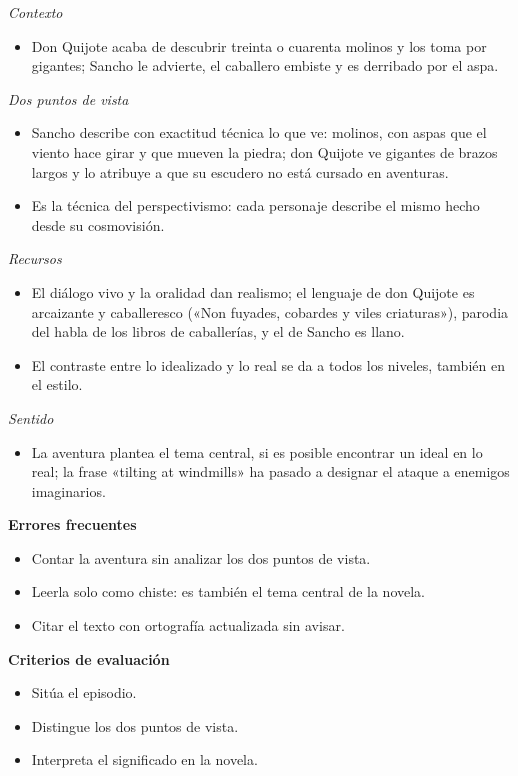 \documentclass{book}
\begin{document}
\begin{tcolorbox}[title={Ejercicio resuelto}, studiumworked, breakable]
\noindent\textit{Contexto}
\begin{itemize}
\item Don Quijote acaba de descubrir treinta o cuarenta molinos y los toma por gigantes; Sancho le advierte, el caballero embiste y es derribado por el aspa.
\end{itemize}

\noindent\textit{Dos puntos de vista}
\begin{itemize}
\item Sancho describe con exactitud técnica lo que ve: molinos, con aspas que el viento hace girar y que mueven la piedra; don Quijote ve gigantes de brazos largos y lo atribuye a que su escudero no está cursado en aventuras.
\item Es la técnica del perspectivismo: cada personaje describe el mismo hecho desde su cosmovisión.
\end{itemize}

\noindent\textit{Recursos}
\begin{itemize}
\item El diálogo vivo y la oralidad dan realismo; el lenguaje de don Quijote es arcaizante y caballeresco («Non fuyades, cobardes y viles criaturas»), parodia del habla de los libros de caballerías, y el de Sancho es llano.
\item El contraste entre lo idealizado y lo real se da a todos los niveles, también en el estilo.
\end{itemize}

\noindent\textit{Sentido}
\begin{itemize}
\item La aventura plantea el tema central, si es posible encontrar un ideal en lo real; la frase «tilting at windmills» ha pasado a designar el ataque a enemigos imaginarios.
\end{itemize}

\noindent\textbf{Errores frecuentes}
\begin{itemize}
\item Contar la aventura sin analizar los dos puntos de vista.
\item Leerla solo como chiste: es también el tema central de la novela.
\item Citar el texto con ortografía actualizada sin avisar.
\end{itemize}

\noindent\textbf{Criterios de evaluación}
\begin{itemize}
\item Sitúa el episodio.
\item Distingue los dos puntos de vista.
\item Interpreta el significado en la novela.
\end{itemize}
\end{tcolorbox}
\end{document}
